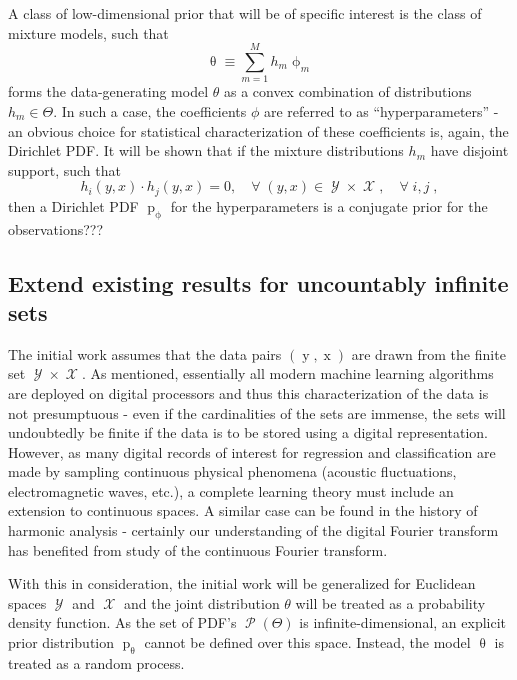 \documentclass[12pt]{article}
\DeclareMathOperator{\xrm}{\mathrm{x}}
\DeclareMathOperator{\yrm}{\mathrm{y}}
\DeclareMathOperator{\prm}{\mathrm{p}}
\DeclareMathOperator{\Xcal}{\mathcal{X}}
\DeclareMathOperator{\Ycal}{\mathcal{Y}}
\DeclareMathOperator{\Pcal}{\mathcal{P}}
\begin{document}
A class of low-dimensional prior that will be of specific interest is the class of mixture models, such that
\begin{equation}
\uptheta \equiv \sum_{m = 1}^M h_m \upphi_m
\end{equation}
forms the data-generating model $\theta$ as a convex combination of distributions $h_m \in \Theta$. In such a case, the coefficients $\phi$ are referred to as ``hyperparameters'' - an obvious choice for statistical characterization of these coefficients is, again, the Dirichlet PDF. It will be shown that if the mixture distributions $h_m$ have disjoint support, such that
\begin{equation}
h_i(y,x) \cdot h_j(y,x) = 0, \quad \forall \; (y,x) \in \Ycal \times \Xcal, \quad \forall \; i,j \;,
\end{equation}
then a Dirichlet PDF $\prm_{\upphi}$ for the hyperparameters is a conjugate prior for the observations???



\subsection{Extend existing results for uncountably infinite sets}

The initial work assumes that the data pairs $(\yrm,\xrm)$ are drawn from the finite set $\Ycal \times \Xcal$. As mentioned, essentially all modern machine learning algorithms are deployed on digital processors and thus this characterization of the data is not presumptuous - even if the cardinalities of the sets are immense, the sets will undoubtedly be finite if the data is to be stored using a digital representation. However, as many digital records of interest for regression and classification are made by sampling continuous physical phenomena (acoustic fluctuations, electromagnetic waves, etc.), a complete learning theory must include an extension to continuous spaces. A similar case can be found in the history of harmonic analysis - certainly our understanding of the digital Fourier transform has benefited from study of the continuous Fourier transform.

With this in consideration, the initial work will be generalized for Euclidean spaces $\Ycal$ and $\Xcal$ and the joint distribution $\theta$ will be treated as a probability density function. As the set of PDF's $\Pcal(\Theta)$ is infinite-dimensional, an explicit prior distribution $\prm_{\uptheta}$ cannot be defined over this space. Instead, the model $\uptheta$ is treated as a random process. 
\end{document}
